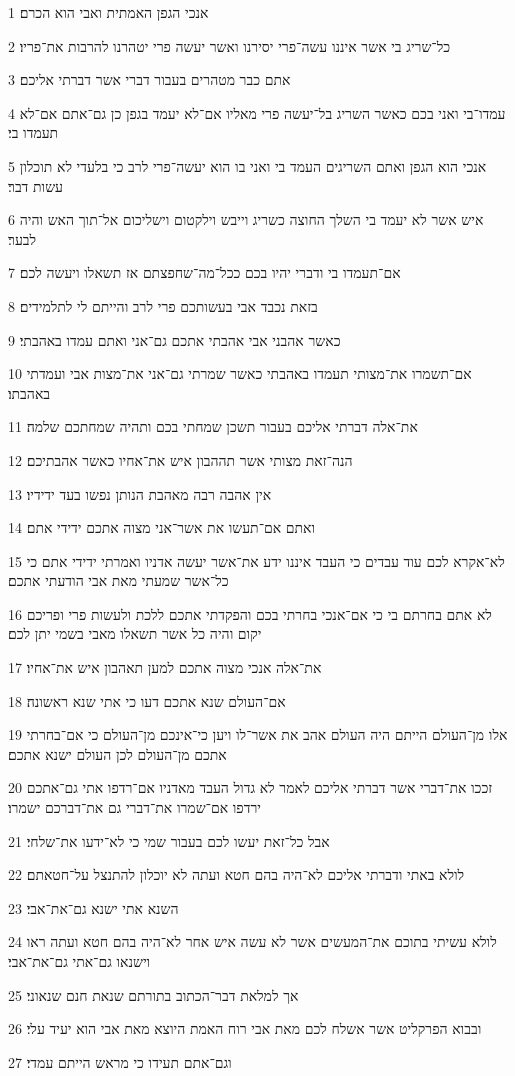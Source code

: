 \par 1 אנכי הגפן האמתית ואבי הוא הכרם׃
\par 2 כל־שריג בי אשר איננו עשה־פרי יסירנו ואשר יעשה פרי יטהרנו להרבות את־פריו׃
\par 3 אתם כבר מטהרים בעבור דברי אשר דברתי אליכם׃
\par 4 עמדו־בי ואני בכם כאשר השריג בל־יעשה פרי מאליו אם־לא יעמד בגפן כן גם־אתם אם־לא תעמדו בי׃
\par 5 אנכי הוא הגפן ואתם השריגים העמד בי ואני בו הוא יעשה־פרי לרב כי בלעדי לא תוכלון עשות דבר׃
\par 6 איש אשר לא יעמד בי השלך החוצה כשריג וייבש וילקטום וישליכום אל־תוך האש והיה לבער׃
\par 7 אם־תעמדו בי ודברי יהיו בכם ככל־מה־שחפצתם אז תשאלו ויעשה לכם׃
\par 8 בזאת נכבד אבי בעשותכם פרי לרב והייתם לי לתלמידים׃
\par 9 כאשר אהבני אבי אהבתי אתכם גם־אני ואתם עמדו באהבתי׃
\par 10 אם־תשמרו את־מצותי תעמדו באהבתי כאשר שמרתי גם־אני את־מצות אבי ועמדתי באהבתו׃
\par 11 את־אלה דברתי אליכם בעבור תשכן שמחתי בכם ותהיה שמחתכם שלמה׃
\par 12 הנה־זאת מצותי אשר תההבון איש את־אחיו כאשר אהבתיכם׃
\par 13 אין אהבה רבה מאהבת הנותן נפשו בעד ידידיו׃
\par 14 ואתם אם־תעשו את אשר־אני מצוה אתכם ידידי אתם׃
\par 15 לא־אקרא לכם עוד עבדים כי העבד איננו ידע את־אשר יעשה אדניו ואמרתי ידידי אתם כי כל־אשר שמעתי מאת אבי הודעתי אתכם׃
\par 16 לא אתם בחרתם בי כי אם־אנכי בחרתי בכם והפקדתי אתכם ללכת ולעשות פרי ופריכם יקום והיה כל אשר תשאלו מאבי בשמי יתן לכם׃
\par 17 את־אלה אנכי מצוה אתכם למען תאהבון איש את־אחיו׃
\par 18 אם־העולם שנא אתכם דעו כי אתי שנא ראשונה׃
\par 19 אלו מן־העולם הייתם היה העולם אהב את אשר־לו ויען כי־אינכם מן־העולם כי אם־בחרתי אתכם מן־העולם לכן העולם ישנא אתכם׃
\par 20 זככו את־דברי אשר דברתי אליכם לאמר לא גדול העבד מאדניו אם־רדפו אתי גם־אתכם ירדפו אם־שמרו את־דברי גם את־דברכם ישמרו׃
\par 21 אבל כל־זאת יעשו לכם בעבור שמי כי לא־ידעו את־שלחי׃
\par 22 לולא באתי ודברתי אליכם לא־היה בהם חטא ועתה לא יוכלון להתנצל על־חטאתם׃
\par 23 השנא אתי ישנא גם־את־אבי׃
\par 24 לולא עשיתי בתוכם את־המעשים אשר לא עשה איש אחר לא־היה בהם חטא ועתה ראו וישנאו גם־אתי גם־את־אבי׃
\par 25 אך למלאת דבר־הכתוב בתורתם שנאת חנם שנאוני׃
\par 26 ובבוא הפרקליט אשר אשלח לכם מאת אבי רוח האמת היוצא מאת אבי הוא יעיד עלי׃
\par 27 וגם־אתם תעידו כי מראש הייתם עמדי׃

